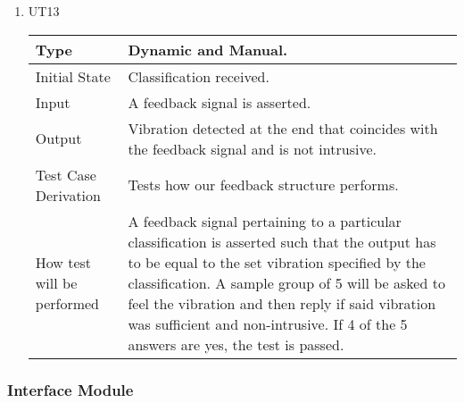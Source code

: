 \documentclass[12pt, titlepage]{article}
\begin{document}
\begin{enumerate}

\item{UT13\\}

\begin{tabular}{ |p{5cm}||p{7cm}| }
    \hline
    Type & Dynamic and Manual. \\
    \hline
    Initial State  &  Classification received. \\
    \hline
    Input &   A feedback signal is asserted. \\
    \hline
    Output &   Vibration detected at the end that coincides with the feedback signal and is not intrusive.  \\
    \hline
    Test Case Derivation &   Tests how our feedback structure performs. \\
    \hline
    How test will be performed & A feedback signal pertaining to a particular classification is asserted such that the output has to be equal to the set vibration specified by the classification. A sample group of 5 will be asked to feel the vibration and then reply if said vibration was sufficient and non-intrusive. If 4 of the 5 answers are yes, the test is passed. \\
    \hline
\end{tabular}

\end{enumerate}



\subsubsection{Interface Module}
\end{document}

